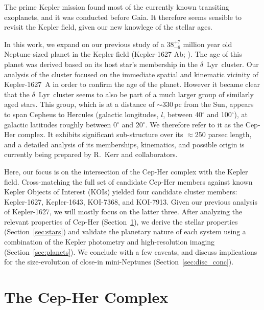 \documentclass[12pt,twocolumn,linenumbers]{aastex63}
\begin{document}
The prime Kepler mission \citep{borucki_kepler_2010} found most of the
currently known transiting exoplanets, and it was conducted before
Gaia.  It therefore seems sensible to revisit the Kepler field, given
our new knowlege of the stellar ages.

In this work, we expand on our previous study of a $38^{+7}_{-6}$
million year old Neptune-sized planet in the Kepler field (Kepler-1627
Ab; \citealt{bouma_kep1627_2022}).  The age of this planet was derived
based on its host star's membership in the $\delta$\ Lyr\ cluster.
Our analysis of the cluster focused on the immediate spatial and
kinematic vicinity of Kepler-1627~A in order to confirm the age of the
planet.  However it became clear that the $\delta$\ Lyr\ cluster seems
to also be part of a much larger group of similarly aged stars.  This
group, which is at a distance of $\sim$330\,pc from the Sun,
appears to span Cepheus to Hercules (galactic longitudes, $l$, between
40$^\circ$ and 100$^\circ$), at galactic latitudes roughly between
0$^\circ$ and 20$^\circ$.  We therefore refer to it as the Cep-Her
complex.  It exhibits significant sub-structure over its $\approx$250
parsec length, and a detailed analysis of its memberships, kinematics,
and possible origin is currently being prepared by R.~Kerr and
collaborators.

Here, our focus is on the intersection of the Cep-Her complex with the
Kepler field.  Cross-matching the full set of candidate Cep-Her
members against known Kepler Objects of Interest (KOIs)
\citep{thompson_planetary_2018} yielded four candidate cluster
members: Kepler-1627, Kepler-1643, KOI-7368, and KOI-7913.  Given our
previous analysis of Kepler-1627, we will mostly focus on the latter
three.  After analyzing the relevant properties of Cep-Her
(Section~\ref{sec:cluster}), we derive the stellar properties
(Section~\ref{sec:stars}) and validate the planetary nature of each
system using a combination of the Kepler photometry and
high-resolution imaging (Section~\ref{sec:planets}).  
We conclude with a few caveats, 
and discuss implications for the size-evolution of close-in
mini-Neptunes (Section~\ref{sec:disc_conc}).

\section{The Cep-Her Complex}
\label{sec:cluster}
\end{document}
